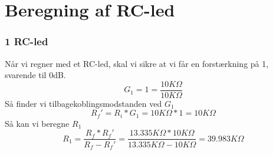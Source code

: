 \chapter{Beregning af RC-led}
\label{app:BeregningAfRCLed}
\subsection{1 RC-led}
Når vi regner med et RC-led, skal vi sikre at vi får en forstærkning på 1, svarende til 0dB. 
%
\begin{equation}
	G_1 = 1 = \frac{10K\Omega}{10K\Omega}
\end{equation}
\noindent
%
Så finder vi tilbagekoblingsmodstanden ved $G_{1}$
%
\begin{equation}
	R_f' = R_i*G_1 = 10K\Omega*1 = 10K\Omega
\end{equation}
\noindent
%
Så kan vi beregne $R_{1}$
%
\begin{equation}
	R_1 = \frac{R_f*R_f'}{R_f-R_f'} = \frac{13.335K\Omega*10K\Omega}{13.335K\Omega-10K\Omega} = 39.983K\Omega
\end{equation}
\noindent

